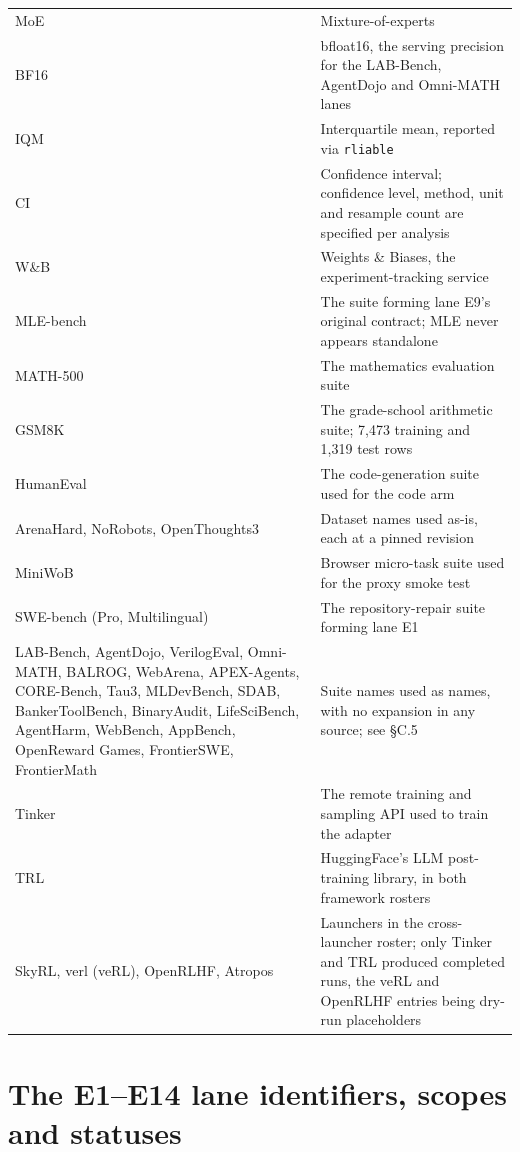 \documentclass[12pt,a4paper]{report}
\providecommand{\real}[1]{#1}          %
\begin{document}
\begin{longtable}[]{@{}
  >{\raggedright\arraybackslash\hspace{0pt}}p{(\linewidth - 4\tabcolsep) * \real{0.5000}}
  >{\raggedright\arraybackslash\hspace{0pt}}p{(\linewidth - 4\tabcolsep) * \real{0.5000}}@{}}
MoE & Mixture-of-experts \\
BF16 & bfloat16, the serving precision for the LAB-Bench, AgentDojo and
Omni-MATH lanes \\
IQM & Interquartile mean, reported via \texttt{rliable} \\
CI & Confidence interval; confidence level, method, unit and resample
count are specified per analysis \\
W\&B & Weights \& Biases, the experiment-tracking service \\
MLE-bench & The suite forming lane E9's original contract; MLE never
appears standalone \\
MATH-500 & The mathematics evaluation suite \\
GSM8K & The grade-school arithmetic suite; 7,473 training and 1,319 test
rows \\
HumanEval & The code-generation suite used for the code arm \\
ArenaHard, NoRobots, OpenThoughts3 & Dataset names used as-is, each at a
pinned revision \\
MiniWoB & Browser micro-task suite used for the proxy smoke test \\
SWE-bench (Pro, Multilingual) & The repository-repair suite forming lane
E1 \\
LAB-Bench, AgentDojo, VerilogEval, Omni-MATH, BALROG, WebArena,
APEX-Agents, CORE-Bench, Tau3, MLDevBench, SDAB, BankerToolBench,
BinaryAudit, LifeSciBench, AgentHarm, WebBench, AppBench, OpenReward
Games, FrontierSWE, FrontierMath & Suite names used as names, with no
expansion in any source; see §C.5 \\
Tinker & The remote training and sampling API used to train the
adapter \\
TRL & HuggingFace's LLM post-training library, in both framework
rosters \\
SkyRL, verl (veRL), OpenRLHF, Atropos & Launchers in the cross-launcher
roster; only Tinker and TRL produced completed runs, the veRL and
OpenRLHF entries being dry-run placeholders \\
\end{longtable}

\section{The E1--E14 lane identifiers, scopes and
statuses}\label{the-e1e14-lane-identifiers-scopes-and-statuses}
\end{document}
